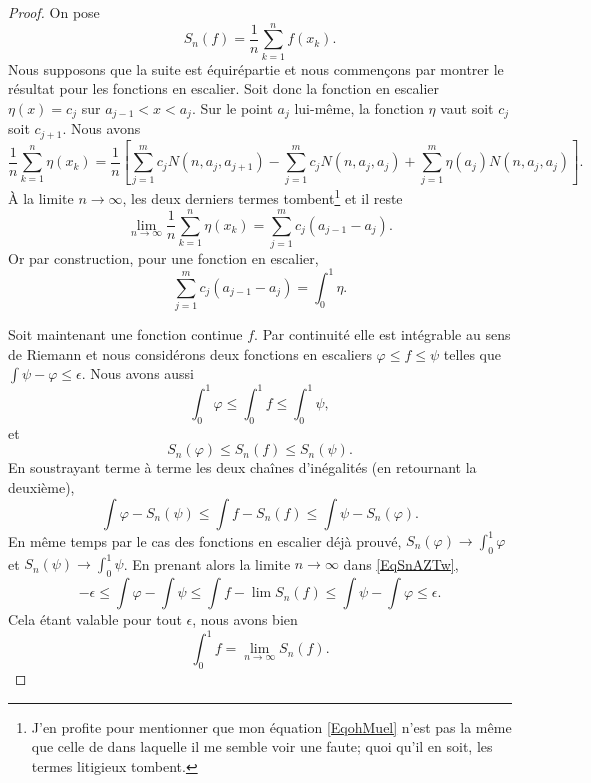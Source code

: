 \begin{proof}
    On pose 
    \begin{equation}
        S_n(f)=\frac{1}{ n }\sum_{k=1}^nf(x_k).
    \end{equation}
    Nous supposons que la suite est équirépartie et nous commençons par montrer le résultat pour les fonctions en escalier. Soit donc la fonction en escalier \( \eta(x)=c_j\) sur \( a_{j-1}< x<a_j\). Sur le point \( a_j\) lui-même, la fonction \( \eta\) vaut soit \( c_j\) soit \( c_{j+1}\). Nous avons
    \begin{equation}    \label{EqohMuel}
        \frac{1}{ n }\sum_{k=1}^n\eta(x_k)=\frac{1}{ n }\left[  \sum_{j=1}^mc_jN(n,a_j,a_{j+1})-\sum_{j=1}^mc_jN(n,a_j,a_j)+\sum_{j=1}^m\eta(a_j)N(n,a_j,a_j) \right].
    \end{equation}
    À la limite \( n\to\infty\), les deux derniers termes tombent\footnote{J'en profite pour mentionner que mon équation \eqref{EqohMuel} n'est pas la même que celle de \cite{ytMOpe} dans laquelle il me semble voir une faute; quoi qu'il en soit, les termes litigieux tombent.} et il reste
    \begin{equation}
        \lim_{n\to \infty} \frac{1}{ n }\sum_{k=1}^n\eta(x_k)=\sum_{j=1}^mc_j(a_{j-1}-a_j).
    \end{equation}
    Or par construction, pour une fonction en escalier,
    \begin{equation}
        \sum_{j=1}^mc_j(a_{j-1}-a_j)=\int_0^1\eta.
    \end{equation}
    
    Soit maintenant une fonction continue \( f\). Par continuité elle est intégrable au sens de Riemann et nous considérons deux fonctions en escaliers \( \varphi\leq f\leq \psi\) telles que \( \int \psi-\varphi\leq \epsilon\). Nous avons aussi
    \begin{equation}    \label{EqHerTgZ}
        \int_0^1\varphi\leq\int_0^1f\leq \int_0^1\psi,
    \end{equation}
    et
    \begin{equation}
        S_n(\varphi)\leq S_n(f)\leq S_n(\psi).
    \end{equation}
    En soustrayant terme à terme les deux chaînes d'inégalités (en retournant la deuxième),
    \begin{equation}    \label{EqSnAZTw}
        \int\varphi-S_n(\psi)\leq \int f-S_n(f)\leq \int\psi-S_n(\varphi).
    \end{equation}
    En même temps par le cas des fonctions en escalier déjà prouvé, \( S_n(\varphi)\to\int_0^1\varphi\) et \( S_n(\psi)\to\int_0^1\psi\). En prenant alors la limite \( n\to \infty\) dans \eqref{EqSnAZTw},
    \begin{equation}
        -\epsilon\leq \int\varphi-\int \psi\leq \int f-\lim S_n(f)\leq \int\psi-\int\varphi\leq \epsilon.    
    \end{equation}
    Cela étant valable pour tout \( \epsilon\), nous avons bien
    \begin{equation}
        \int_0^1f=\lim_{n\to \infty} S_n(f).
    \end{equation}
    

\end{proof}
